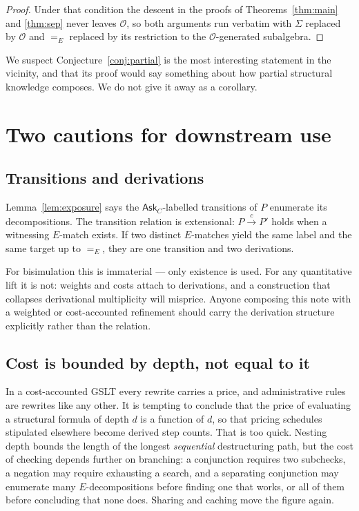 \documentclass[11pt]{article}
\theoremstyle{plain}
\theoremstyle{definition}
\newcommand{\Ask}{\mathsf{Ask}}
\newcommand{\Ob}{\mathcal{O}}
\begin{document}
\begin{proof}
Under that condition the descent in the proofs of Theorems~\ref{thm:main} and \ref{thm:sep} never
leaves $\Ob$, so both arguments run verbatim with $\Sigma$ replaced by $\Ob$ and $=_E$ replaced by its
restriction to the $\Ob$-generated subalgebra.
\end{proof}

We suspect Conjecture~\ref{conj:partial} is the most interesting statement in the vicinity, and
that its proof would say something about how partial structural knowledge composes. We do not give it
away as a corollary.

\section{Two cautions for downstream use}

\subsection{Transitions and derivations}
\label{sec:mult}

Lemma~\ref{lem:exposure} says the $\Ask_C$-labelled transitions of $P$ enumerate its decompositions.
The transition relation is extensional: $P \xrightarrow{c} P'$ holds when a witnessing $E$-match exists.
If two distinct $E$-matches yield the same label and the same target up to $=_E$, they are one
transition and two derivations.

For bisimulation this is immaterial --- only existence is used. For any quantitative lift it is not:
weights and costs attach to derivations, and a construction that collapses derivational multiplicity
will misprice. Anyone composing this note with a weighted or cost-accounted refinement should carry the
derivation structure explicitly rather than the relation.

\subsection{Cost is bounded by depth, not equal to it}
\label{sec:cost}

In a cost-accounted GSLT \cite{CostMonad} every rewrite carries a price, and administrative rules are
rewrites like any other. It is tempting to conclude that the price of evaluating a structural formula of
depth $d$ is a function of $d$, so that pricing schedules stipulated elsewhere become derived step
counts. That is too quick. Nesting depth bounds the length of the longest \emph{sequential}
destructuring path, but the cost of checking depends further on branching: a conjunction requires two
subchecks, a negation may require exhausting a search, and a separating conjunction may enumerate many
$E$-decompositions before finding one that works, or all of them before concluding that none does.
Sharing and caching move the figure again.
\end{document}
